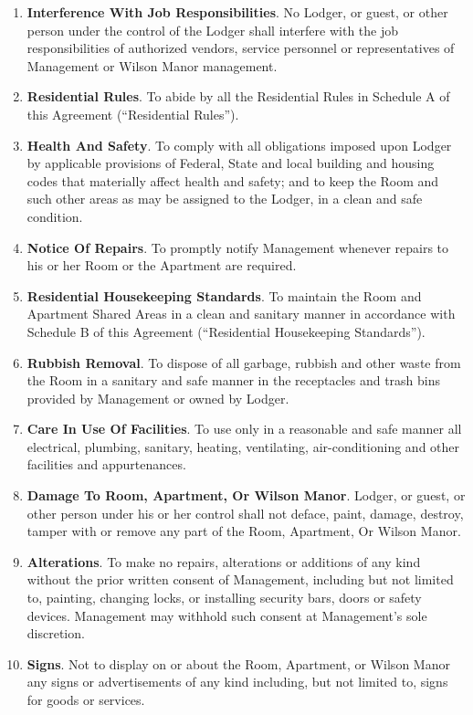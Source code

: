 \documentclass[12pt,letterpaper]{article}
\newcommand{\lodger}{Lodger}
\newcommand{\rules}{Residential Rules}
\newcommand{\standards}{Residential Housekeeping Standards}
\newcommand{\management}{Management}
\newcommand{\condo}{Wilson Manor}
\newcommand{\apt}{Apartment}
\newcommand{\room}{Room}
\newcommand{\shared}{Apartment Shared Areas}
\begin{document}
\begin{enumerate}
\begin{enumerate}
				\item \textbf{Interference With Job Responsibilities}. No \lodger{}, or guest, or other person under the control of the \lodger{} shall interfere with the job responsibilities of authorized vendors, service personnel or representatives of \management{} or \condo{} management. 
				\item \textbf{\rules{}}. To abide by all the \rules{} in Schedule A of this Agreement (``\rules{}'').
				\item \textbf{Health And Safety}. To comply with all obligations imposed upon \lodger{} by applicable provisions of Federal, State and local building and housing codes that materially affect health and safety; and to keep the \room{} and such other areas as may be assigned to the \lodger{}, in a clean and safe condition. 
				\item \textbf{Notice Of Repairs}. To promptly notify \management{} whenever repairs to his or her \room{} or the \apt{} are required. 
				\item \textbf{\standards{}}. To maintain the \room{} and \shared{} in a clean and sanitary manner in accordance with Schedule B of this Agreement (``\standards{}'').
				\item \textbf{Rubbish Removal}. To dispose of all garbage, rubbish and other waste from the \room{} in a sanitary and safe manner in the receptacles and trash bins provided by \management{} or owned by \lodger{}. 
				\item \textbf{Care In Use Of Facilities}. To use only in a reasonable and safe manner all electrical, plumbing, sanitary, heating, ventilating, air-conditioning and other facilities and appurtenances. 
				\item \textbf{Damage To \room{}, \apt{}, Or \condo{}}. \lodger{}, or guest, or other person under his or her control shall not deface, paint, damage, destroy, tamper with or remove any part of the \room{}, \apt{}, Or \condo{}.
				\item \textbf{Alterations}. To make no repairs, alterations or additions of any kind without the prior written consent of \management{}, including but not limited to, painting, changing locks, or installing security bars, doors or safety devices. \management{} may withhold such consent at \management{}'s sole discretion. 
				\item \textbf{Signs}. Not to display on or about the \room{}, \apt{}, or \condo{} any signs or advertisements of any kind including, but not limited to, signs for goods or services. 
			\end{enumerate}

\end{enumerate}
\end{document}
